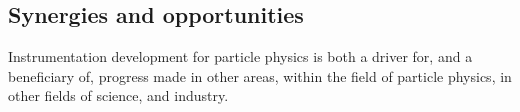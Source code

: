 



\subsection{Synergies and opportunities}
\label{sec:detector-synergies}

Instrumentation development for particle physics is both a driver for, and a beneficiary of, progress made in other areas, within the field of particle physics, in other fields of science, and industry. 

